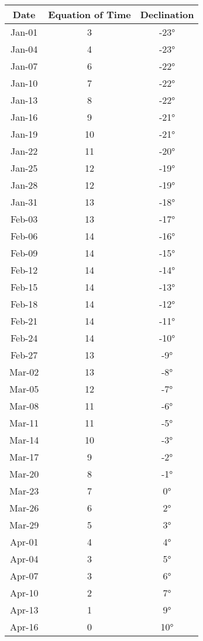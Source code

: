 \begin{footnotesize}
	\begin{minipage}{0.5\textwidth}
\begin{tabular}{c | c | c }
	Date&Equation of Time&Declination\\\hline
Jan-01 & 3 & -23°\\\hline
Jan-04 & 4 & -23°\\\hline
Jan-07 & 6 & -22°\\\hline
Jan-10 & 7 & -22°\\\hline
Jan-13 & 8 & -22°\\\hline
Jan-16 & 9 & -21°\\\hline
Jan-19 & 10 & -21°\\\hline
Jan-22 & 11 & -20°\\\hline
Jan-25 & 12 & -19°\\\hline
Jan-28 & 12 & -19°\\\hline
Jan-31 & 13 & -18°\\\hline
Feb-03 & 13 & -17°\\\hline
Feb-06 & 14 & -16°\\\hline
Feb-09 & 14 & -15°\\\hline
Feb-12 & 14 & -14°\\\hline
Feb-15 & 14 & -13°\\\hline
Feb-18 & 14 & -12°\\\hline
Feb-21 & 14 & -11°\\\hline
Feb-24 & 14 & -10°\\\hline
Feb-27 & 13 & -9°\\\hline
Mar-02 & 13 & -8°\\\hline
Mar-05 & 12 & -7°\\\hline
Mar-08 & 11 & -6°\\\hline
Mar-11 & 11 & -5°\\\hline
Mar-14 & 10 & -3°\\\hline
Mar-17 & 9 & -2°\\\hline
Mar-20 & 8 & -1°\\\hline
Mar-23 & 7 & 0°\\\hline
Mar-26 & 6 & 2°\\\hline
Mar-29 & 5 & 3°\\\hline
Apr-01 & 4 & 4°\\\hline
Apr-04 & 3 & 5°\\\hline
Apr-07 & 3 & 6°\\\hline
Apr-10 & 2 & 7°\\\hline
Apr-13 & 1 & 9°\\\hline
Apr-16 & 0 & 10°\\\hline

\end{tabular}
\end{minipage}
\end{footnotesize}
